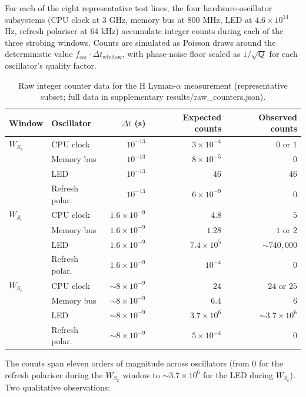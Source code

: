 \documentclass[twocolumn,11pt,a4paper]{article}
\theoremstyle{thmstyle}
\theoremstyle{axiomstyle}
\theoremstyle{definition}
\theoremstyle{remark}
\begin{document}
For each of the eight representative test lines, the four hardware-oscillator subsystems (CPU clock at $3$ GHz, memory bus at $800$ MHz, LED at $4.6\times 10^{14}$ Hz, refresh polariser at $64$ kHz) accumulate integer counts during each of the three strobing windows. Counts are simulated as Poisson draws around the deterministic value $f_{\text{osc}} \cdot \Delta t_{\text{window}}$, with phase-noise floor scaled as $1/\sqrt{Q}$ for each oscillator's quality factor.

\begin{table}[H]
\centering
\caption{Raw integer counter data for the H Lyman-$\alpha$ measurement (representative subset; full data in supplementary results/raw\_counters.json).}
\label{tab:raw_counts}
\small
\begin{tabular}{llrrr}
\toprule
Window & Oscillator & $\Delta t$ (s) & Expected counts & Observed counts\\
\midrule
$W_{S_{k}}$ & CPU clock     & $10^{-13}$ & $3\times 10^{-4}$  & $0$ or $1$\\
            & Memory bus    & $10^{-13}$ & $8\times 10^{-5}$  & $0$\\
            & LED           & $10^{-13}$ & $46$               & $46$\\
            & Refresh polar.& $10^{-13}$ & $6\times 10^{-9}$  & $0$\\
$W_{S_{t}}$ & CPU clock     & $1.6\times 10^{-9}$ & $4.8$ & $5$\\
            & Memory bus    & $1.6\times 10^{-9}$ & $1.28$ & $1$ or $2$\\
            & LED           & $1.6\times 10^{-9}$ & $7.4\times 10^{5}$ & $\sim 740{,}000$\\
            & Refresh polar.& $1.6\times 10^{-9}$ & $10^{-4}$ & $0$\\
$W_{S_{e}}$ & CPU clock     & $\sim 8\times 10^{-9}$ & $24$ & $24$ or $25$\\
            & Memory bus    & $\sim 8\times 10^{-9}$ & $6.4$ & $6$\\
            & LED           & $\sim 8\times 10^{-9}$ & $3.7\times 10^{6}$ & $\sim 3.7\times 10^{6}$\\
            & Refresh polar.& $\sim 8\times 10^{-9}$ & $5\times 10^{-4}$ & $0$\\
\bottomrule
\end{tabular}
\end{table}

The counts span eleven orders of magnitude across oscillators (from $0$ for the refresh polariser during the $W_{S_{k}}$ window to $\sim 3.7\times 10^{6}$ for the LED during $W_{S_{e}}$). Two qualitative observations:
\end{document}
